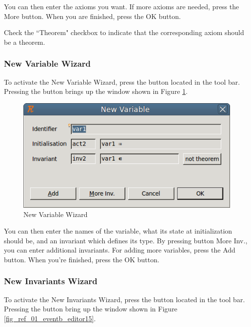 You can then enter the axioms you want. If more axioms are needed, press the \textsf{More} button. When you are finished, press the \textsf{OK} button.

Check the ``Theorem" checkbox to indicate that the corresponding axiom should be a theorem.

\subsubsection{New Variable Wizard}

To activate the \textsf{New Variable Wizard}, press the  button located in the tool bar. Pressing the button brings up the window shown in Figure \ref{fig_ref_01_eventb_editor14}.

\begin{figure}[!ht]
\begin{center}
	\includegraphics{img/reference/ref_01_eventb_editor14.png}
	\caption{New Variable Wizard}
	\label{fig_ref_01_eventb_editor14}
\end{center}
\end{figure}

You can then enter the names of the variable, what its state at initialization should be, and an invariant which defines its type. By pressing button \textsf{More Inv.}, you can enter additional invariants. For adding more variables, press the \textsf{Add} button. When you're finished, press the \textsf{OK} button. 

\subsubsection{New Invariants Wizard}

To activate the \textsf{New Invariants Wizard}, press the  button located in the tool bar. Pressing the button bring up the window shown in Figure \ref{fig_ref_01_eventb_editor15}.


